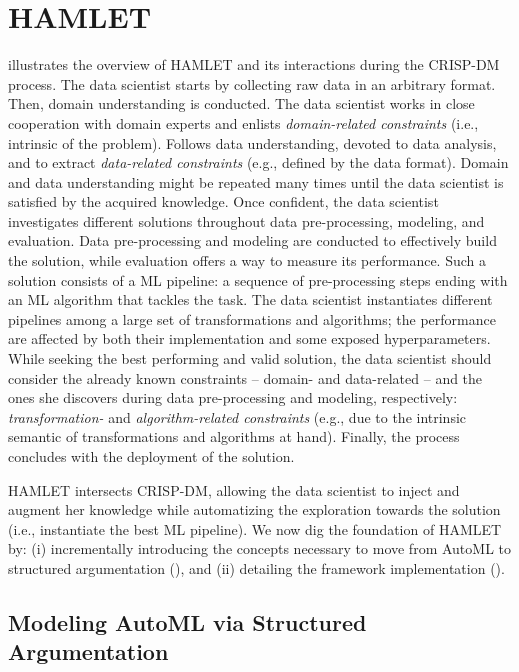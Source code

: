 \section{HAMLET}\label{hamlet-sec:implementation}

 illustrates the overview of HAMLET and its interactions during the CRISP-DM process.
The data scientist starts by collecting raw data in an arbitrary format.
Then, domain understanding is conducted.
The data scientist works in close cooperation with domain experts and enlists \emph{domain-related constraints} (i.e., intrinsic of the problem).
Follows data understanding, devoted to data analysis, and to extract \emph{data-related constraints} (e.g., defined by the data format).
Domain and data understanding might be repeated many times until the data scientist is satisfied by the acquired knowledge.
Once confident, the data scientist investigates different solutions throughout data pre-processing, modeling, and evaluation.
Data pre-processing and modeling are conducted to effectively build the solution, while evaluation offers a way to measure its performance.
Such a solution consists of a ML pipeline: a sequence of pre-processing steps ending with an ML algorithm that tackles the task.
The data scientist instantiates different pipelines among a large set of transformations and algorithms; the performance are affected by both their implementation and some exposed hyperparameters.
While seeking the best performing and valid solution, the data scientist should consider the already known constraints -- domain- and data-related -- and the ones she discovers during data pre-processing and modeling, respectively: \emph{transformation-} and \emph{algorithm-related constraints} (e.g., due to the intrinsic semantic of transformations and algorithms at hand).
Finally, the process concludes with the deployment of the solution.

HAMLET intersects CRISP-DM, allowing the data scientist to inject and augment her knowledge while automatizing the exploration towards the solution (i.e., instantiate the best ML pipeline).
We now dig the foundation of HAMLET by: (i) incrementally introducing the concepts necessary to move from AutoML to structured argumentation (), and (ii) detailing the framework implementation  ().

\subsection{Modeling AutoML via Structured Argumentation}
\label{hamlet-ssec:argumentation-formalization}

